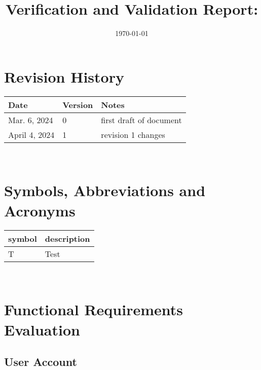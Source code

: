 \documentclass[12pt, titlepage]{article}
\begin{document}
\title{Verification and Validation Report: \progname} 
\author{\authname}
\date{\today}
	
\maketitle


\section{Revision History}

\begin{tabularx}{\textwidth}{p{3cm}p{2cm}X}
\toprule {\bf Date} & {\bf Version} & {\bf Notes}\\
\midrule
Mar. 6, 2024 & 0 & first draft of document\\
April 4, 2024 & 1 & revision 1 changes
\end{tabularx}

~\newpage

\section{Symbols, Abbreviations and Acronyms}

\renewcommand{\arraystretch}{1.2}
\begin{tabular}{l l} 
  \toprule		
  \textbf{symbol} & \textbf{description}\\
  \midrule 
  T & Test\\
  \bottomrule
\end{tabular}\\

\newpage

\tableofcontents

\listoftables %

\listoffigures %

\newpage


\section{Functional Requirements Evaluation}
\subsection{User Account}
\end{document}
